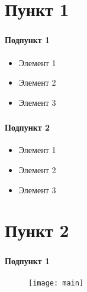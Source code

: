 
\frame[plain]{\titlepage} %


\section{Пункт 1}

\begin{frame}
\frametitle{\insertsection}
\framesubtitle{Подпункт 1}
\begin{itemize}
	\item Элемент 1
	\item Элемент 2
	\item Элемент 3
\end{itemize}
\end{frame}

\begin{frame}
\frametitle{\insertsection}
\framesubtitle{Подпункт 2}
\begin{itemize}
	\item Элемент 1
	\item Элемент 2
	\item Элемент 3
\end{itemize}
\end{frame}


\section{Пункт 2}

\begin{frame}
\frametitle{\insertsection}
\framesubtitle{Подпункт 1}
\begin{figure}[h]
	\begin{center}
		\texttt{[image: main]}
	 \end{center}
\end{figure}
\end{frame}

